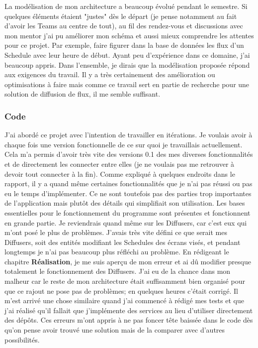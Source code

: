 \documentclass[french]{article}
\begin{document}
La modélisation de mon architecture a beaucoup évolué pendant le semestre. Si quelques éléments étaient "justes" dès le départ (je pense notamment au fait d'avoir les Teams au centre de tout), au fil des rendez-vous et discussions avec mon mentor j'ai pu améliorer mon schéma et aussi mieux comprendre les attentes pour ce projet. Par exemple, faire figurer dans la base de données les flux d'un Schedule avec leur heure de début. Ayant peu d'expérience dans ce domaine, j'ai beaucoup appris.\newline
Dans l'ensemble, je dirais que la modélisation proposée répond aux exigences du travail. Il y a très certainement des amélioration ou optimisations à faire mais comme ce travail sert en partie de recherche pour une solution de diffusion de flux, il me semble suffisant.

\subsubsection{Code}

J'ai abordé ce projet avec l'intention de travailler en itérations. Je voulais avoir à chaque fois une version fonctionnelle de ce sur quoi je travaillais actuellement. Cela m'a permis d'avoir très vite des versions 0.1 des mes diverses fonctionnalités et de directement les connecter entre elles (je ne voulais pas me retrouver à devoir tout connecter à la fin). \newline
Comme expliqué à quelques endroits dans le rapport, il y a quand même certaines fonctionnalités que je n'ai pas réussi ou pas eu le temps d'implémenter. Ce ne sont toutefois pas des parties trop importantes de l'application mais plutôt des détails qui simplifiait son utilisation. Les bases essentielles pour le fonctionnement du programme sont présentes et fonctionnent en grande partie. \newline
Je reviendrais quand même sur les Diffusers, car c'est eux qui m'ont posé le plus de problèmes. J'avais très vite défini ce que serait mes Diffusers, soit des entités modifiant les Schedules des écrans visés, et pendant longtemps je n'ai pas beaucoup plus réfléchi au problème. En rédigeant le chapitre \textbf{Réalisation}, je me suis aperçu de mon erreur et ai dû modifier presque totalement le fonctionnement des Diffusers. J'ai eu de la chance dans mon malheur car le reste de mon architecture était suffisamment bien organisé pour que ce rajout ne pose pas de problèmes; en quelques heures c'était corrigé. Il m'est arrivé une chose similaire quand j'ai commencé à rédigé mes tests et que j'ai réalisé qu'il fallait que j'implémente des services au lieu d'utiliser directement des dépôts. Ces erreurs m'ont appris à ne pas foncer tête baissée dans le code dès qu'on pense avoir trouvé une solution mais de la comparer avec d'autres possibilités. \newline 
\end{document}
